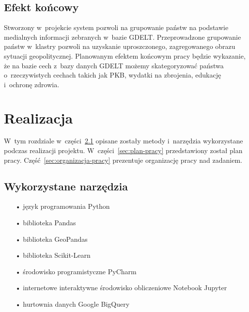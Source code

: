\documentclass[11pt]{report}
\begin{document}
    \section{Efekt końcowy}\label{sec:efekt-końcowy}
    Stworzony w~projekcie system pozwoli na grupowanie państw na podstawie medialnych informacji zebranych w~bazie GDELT.
    Przeprowadzone grupowanie państw w~klastry pozwoli na uzyskanie uproszczonego, zagregowanego obrazu sytuacji geopolitycznej.
    Planowanym efektem końcowym pracy będzie wykazanie, że na bazie cech z~bazy danych GDELT możemy skategoryzować państwa o~rzeczywistych cechach takich jak PKB, wydatki na zbrojenia, edukację i~ochronę zdrowia.


    \chapter{Realizacja}\label{ch:realizacja}

    W~tym rozdziale w~części~\ref{sec:wykorzystane-narzędzia} opisane zostały metody i~narzędzia wykorzystane podczas realizacji projektu.
    W~części~\ref{sec:plan-pracy} przedstawiony został plan pracy.
    Część~\ref{sec:organizacja-pracy} prezentuje organizację pracy nad zadaniem.


    \section{Wykorzystane narzędzia}\label{sec:wykorzystane-narzędzia}

    \begin{enumerate}
        \item[•] język programowania Python~\cite{python}
        \item[•] biblioteka Pandas~\cite{pandas}
        \item[•] biblioteka GeoPandas~\cite{geopandas}
        \item[•] biblioteka Scikit-Learn~\cite{scikit}
        \item[•] środowisko programistyczne PyCharm~\cite{pycharm}
        \item[•] internetowe interaktywne środowisko obliczeniowe Notebook Jupyter~\cite{jupyter}
        \item[•] hurtownia danych Google BigQuery~\cite{bigquery}
    \end{enumerate}
\end{document}
